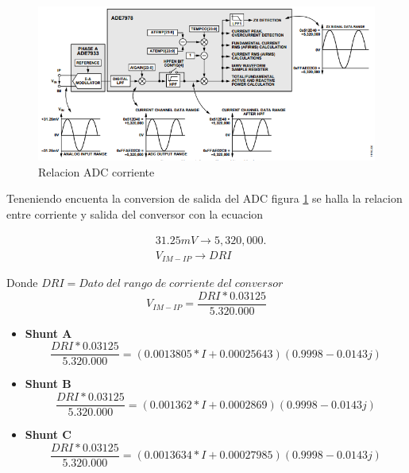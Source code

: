         \begin{figure}[H]
            \begin{center}
                \includegraphics[width = 15cm]{3Proyecto/ConversorCorrienteADE.PNG}
                \caption{ Relacion ADC corriente} 
                \label{fig:Relacion ADC corriente}
            \end{center}
        \end{figure}

        Teneniendo encuenta la conversion de salida del ADC figura \ref{fig:Relacion ADC corriente} se halla la relacion entre corriente y salida del conversor con la ecuacion
        
        \begin{align*}
            &31.25mV \rightarrow 5,320,000.\\
            &V_{IM-IP} \rightarrow DRI
        \end{align*}

        Donde $DRI = Dato\;del\;rango\;de\;corriente\;del\;conversor$\\

        \begin{equation}\label{relacionConversorCorriente}
            V_{IM-IP} = \frac{DRI * 0.03125}{5.320.000}
        \end{equation}

        \begin{itemize}
            \item \textbf{Shunt A} 
                \begin{equation}\label{Tension V IM-IP}
                    \frac{DRI * 0.03125}{5.320.000} = (0.0013805*I + 0.00025643)( 0.9998 - 0.0143j)
                \end{equation}
            \item \textbf{Shunt B} 
                \begin{equation}\label{Tension V IM-IP}
                    \frac{DRI * 0.03125}{5.320.000} = (0.001362*I + 0.0002869)( 0.9998 - 0.0143j)
                \end{equation}
            \item \textbf{Shunt C} 
                \begin{equation}\label{Tension V IM-IP}
                    \frac{DRI * 0.03125}{5.320.000} = (0.0013634*I + 0.00027985)( 0.9998 - 0.0143j)
                \end{equation}
        \end{itemize}
        
